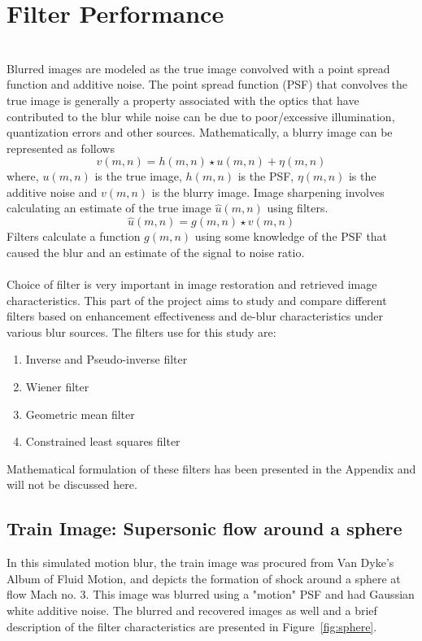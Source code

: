 \graphicspath{{mehul_pics/}}%

\section{Filter Performance}
\\
Blurred images are modeled as the true image convolved with a point spread function and additive noise. The point spread function (PSF) that convolves the true image is generally a property associated with the optics that have contributed to the blur while noise can be due to poor/excessive illumination, quantization errors and other sources. Mathematically, a blurry image can be represented as follows\\
\begin{equation}
v(m,n)= h(m,n) \star u(m,n) + \eta(m,n)
\end{equation}
where, $u(m,n)$ is the true image, $h(m,n)$ is the PSF, $\eta(m,n)$ is the additive noise and $v(m,n)$ is the blurry image. Image sharpening involves calculating an estimate of the true image $\hat{u}(m,n)$ using filters.
\begin{equation}
\hat{u}(m,n)= g(m,n) \star v(m,n)
\end{equation}
Filters calculate a function $g(m,n)$ using some knowledge of the PSF that caused the blur and an estimate of the signal to noise ratio.\\

\\
Choice of filter is very important in image restoration and retrieved image characteristics. This part of the project aims to study and compare different filters based on enhancement effectiveness and de-blur characteristics under various blur sources. The filters use for this study are: 
\begin{enumerate}
\item Inverse and Pseudo-inverse filter
\item Wiener filter
\item Geometric mean filter
\item Constrained least squares filter
\end{enumerate} 
Mathematical formulation of these filters has been presented in the Appendix and will not be discussed here. 
\subsection{Train Image: Supersonic flow around a sphere}
In this simulated motion blur, the train image was procured from Van Dyke's Album of Fluid Motion, and depicts the formation of shock around a sphere at flow Mach no. 3. This image was blurred using a "motion" PSF and had Gaussian white additive noise. The blurred and recovered images as well and a brief description of the filter characteristics are presented in Figure~\ref{fig:sphere}.

